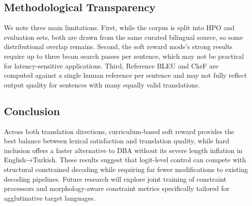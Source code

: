 \documentclass[conference]{IEEEtran}
\begin{document}
\subsection{Methodological Transparency}

We note three main limitations. First, while the corpus is split into HPO and evaluation sets, both are drawn from the same curated bilingual source, so some distributional overlap remains. Second, the soft reward mode's strong results require up to three beam search passes per sentence, which may not be practical for latency-sensitive applications. Third, Reference BLEU and ChrF are computed against a single human reference per sentence and may not fully reflect output quality for sentences with many equally valid translations.

\subsection{Conclusion}

Across both translation directions, curriculum-based soft reward provides the best balance between lexical satisfaction and translation quality, while hard inclusion offers a faster alternative to DBA without its severe length inflation in English→Turkish. These results suggest that logit-level control can compete with structural constrained decoding while requiring far fewer modifications to existing decoding pipelines. Future research will explore joint training of constraint processors and morphology-aware constraint metrics specifically tailored for agglutinative target languages.



\end{document}
